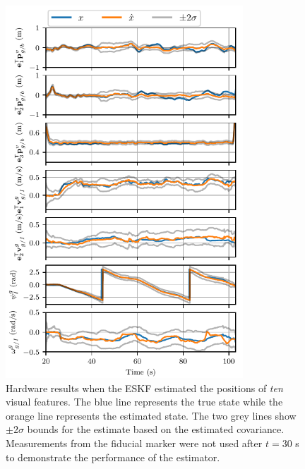 \begin{figure}[htb]
  \centering
  \includegraphics[width=3.5in]{plots/hardware_results}
  \caption[ESKF Hardware Results Using Ten Visual Features]{Hardware results when
    the ESKF estimated the positions of \emph{ten} visual
  features. The blue line represents the true state while the orange line
  represents the estimated state. The two grey lines show $\pm 2 \sigma$ bounds for
  the estimate based on the estimated covariance. Measurements from the fiducial
  marker were not used after $t = 30$ s to demonstrate the performance of the estimator.}
  \label{fig:est_hardware}
\end{figure}

